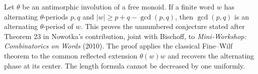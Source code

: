 Let $\theta$ be an antimorphic involution of a free monoid. If a finite
word $w$ has alternating $\theta$-periods $p,q$ and
$|w|\ge p+q-\gcd(p,q)$, then $\gcd(p,q)$ is an alternating
$\theta$-period of $w$. This proves the unnumbered conjecture stated
after Theorem 23 in Nowotka's contribution, joint with Bischoff, to
\emph{Mini-Workshop: Combinatorics on Words} (2010). The proof applies
the classical Fine--Wilf theorem to the common reflected extension
$\theta(w)w$ and recovers the alternating phase at its center.
The length formula cannot be decreased by one uniformly.
